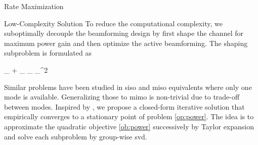 \documentclass[journal]{IEEEtran}
\begin{document}
\begin{section}{Rate Maximization}
	\begin{subsection}{Low-Complexity Solution}
		\label{sc:rate_lc}
		To reduce the computational complexity, we suboptimally decouple the beamforming design by first shape the channel for maximum power gain and then optimize the active beamforming.
		The shaping subproblem is formulated as
		\begin{maxi!}
			{\scriptstyle{\mathbf{\Theta}}}{\lVert {}_ + _ \mathbf{\Theta} _ \rVert _^2}{\label{op:power}}{\label{ob:power}}
		\end{maxi!}
		Similar problems have been studied in \gls{siso} \cite{Shen2020a} and \gls{miso} equivalents \cite{Santamaria2023,Fang2023,Nerini2023,Nerini2023b} where only one mode is available. Generalizing those to \gls{mimo} is non-trivial due to trade-off between modes.
		Inspired by \cite{Nie2017}, we propose a closed-form iterative solution that empirically converges to a stationary point of problem \eqref{op:power}.
		The idea is to approximate the quadratic objective \eqref{ob:power} successively by Taylor expansion and solve each subproblem by group-wise \gls{svd}.


\end{subsection}
\end{section}
\end{document}
